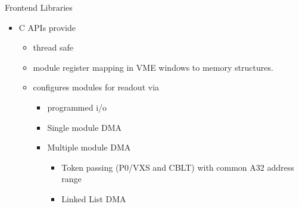 Frontend Libraries
\begin{itemize}
\item C APIs provide
  \begin{itemize}
  \item thread safe
  \item module register mapping in VME windows to memory structures.
  \item configures modules for readout via
    \begin{itemize}
    \item programmed i/o
    \item Single module DMA
    \item Multiple module DMA
       \begin{itemize}
       \item Token passing (P0/VXS and CBLT) with common A32 address range
       \item Linked List DMA
       \end{itemize}
    \end{itemize}
  \end{itemize}
\end{itemize}
